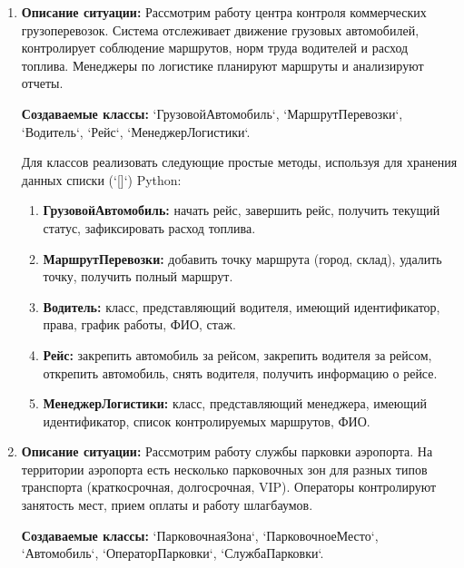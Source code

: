 \begin{enumerate}
\item \textbf{Описание ситуации:} Рассмотрим работу центра контроля коммерческих грузоперевозок. 
Система отслеживает движение грузовых автомобилей, контролирует соблюдение маршрутов, 
норм труда водителей и расход топлива. Менеджеры по логистике планируют маршруты 
и анализируют отчеты.

\textbf{Создаваемые классы:} `ГрузовойАвтомобиль`, `МаршрутПеревозки`, `Водитель`, `Рейс`, `МенеджерЛогистики`.

Для классов реализовать следующие простые методы, используя для хранения данных списки (`[]`) Python:
\begin{enumerate}
    \item \textbf{ГрузовойАвтомобиль:} начать рейс, завершить рейс, получить текущий статус, 
    зафиксировать расход топлива.
    \item \textbf{МаршрутПеревозки:} добавить точку маршрута (город, склад), 
    удалить точку, получить полный маршрут.
    \item \textbf{Водитель:} класс, представляющий водителя, 
    имеющий идентификатор, права, график работы, ФИО, стаж.
    \item \textbf{Рейс:} закрепить автомобиль за рейсом, закрепить водителя за рейсом, 
    открепить автомобиль, снять водителя, получить информацию о рейсе.
    \item \textbf{МенеджерЛогистики:} класс, представляющий менеджера, 
    имеющий идентификатор, список контролируемых маршрутов, ФИО.
\end{enumerate}

\item \textbf{Описание ситуации:} Рассмотрим работу службы парковки аэропорта. 
На территории аэропорта есть несколько парковочных зон для разных типов 
транспорта (краткосрочная, долгосрочная, VIP). 
Операторы контролируют занятость мест, прием оплаты и работу шлагбаумов.

\textbf{Создаваемые классы:} `ПарковочнаяЗона`, `ПарковочноеМесто`, `Автомобиль`, `ОператорПарковки`, `СлужбаПарковки`.


\end{enumerate}
